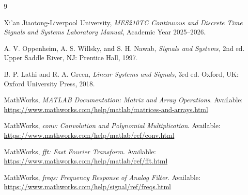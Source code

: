 \documentclass[11pt,a4paper]{article}
\begin{document}
\begin{thebibliography}{9}

Xi'an Jiaotong-Liverpool University, \textit{MES210TC Continuous and Discrete Time Signals and Systems Laboratory Manual}, Academic Year 2025--2026.

A. V. Oppenheim, A. S. Willsky, and S. H. Nawab, \textit{Signals and Systems}, 2nd ed. Upper Saddle River, NJ: Prentice Hall, 1997.

B. P. Lathi and R. A. Green, \textit{Linear Systems and Signals}, 3rd ed. Oxford, UK: Oxford University Press, 2018.

MathWorks, \textit{MATLAB Documentation: Matrix and Array Operations}. Available: \url{https://www.mathworks.com/help/matlab/matrices-and-arrays.html}

MathWorks, \textit{conv: Convolution and Polynomial Multiplication}. Available: \url{https://www.mathworks.com/help/matlab/ref/conv.html}

MathWorks, \textit{fft: Fast Fourier Transform}. Available: \url{https://www.mathworks.com/help/matlab/ref/fft.html}

MathWorks, \textit{freqs: Frequency Response of Analog Filter}. Available: \url{https://www.mathworks.com/help/signal/ref/freqs.html}

\end{thebibliography}
\end{document}
